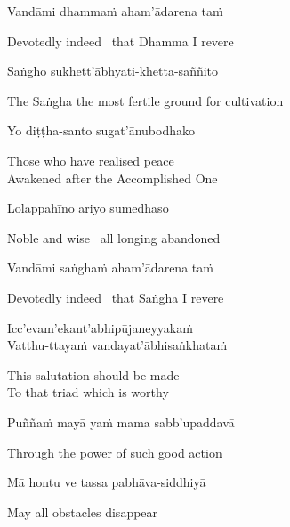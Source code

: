 Vandāmi dhammaṁ aham'ādarena taṁ

\begin{english}
  Devotedly indeed \breathmark\ that Dhamma I revere
\end{english}

Saṅgho sukhett'ābhyati-khetta-saññito

\begin{english}
  The Saṅgha the most fertile ground for cultivation
\end{english}

Yo diṭṭha-santo sugat'ānubodhako

\begin{english}
  Those who have realised peace\\
  Awakened after the Accomplished One
\end{english}

Lolappahīno ariyo sumedhaso

\begin{english}
  Noble and wise \breathmark\ all longing abandoned
\end{english}

Vandāmi saṅghaṁ aham'ādarena taṁ

\begin{english}
  Devotedly indeed \breathmark\ that Saṅgha I revere
\end{english}

Icc'evam'ekant'abhipūjaneyyakaṁ\\
Vatthu-ttayaṁ vandayat'ābhisaṅkhataṁ

\begin{english}
  This salutation should be made\\
  To that triad\ifdigital\makeatletter\hyperlink{endnote11-appendix}\makeatother\fi
  which is worthy
\end{english}

Puññaṁ mayā yaṁ mama sabb'upaddavā

\begin{english}
  Through the power of such good action
\end{english}

\ifninebythirteen\clearpage\fi

Mā hontu ve tassa pabhāva-siddhiyā

\begin{english}
  May all obstacles disappear
\end{english}

